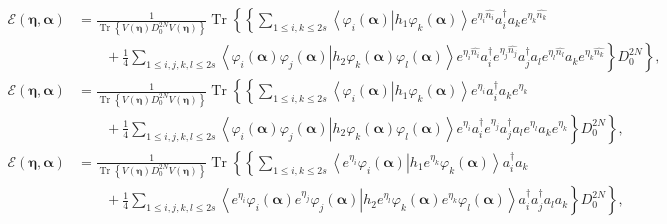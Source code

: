 \documentclass[aps,preprint]{revtex4}%
\begin{document}
\begin{align}
\mathcal{E}\left(  \mathbf{\eta,\alpha}\right)   &  =\frac{1}%
{\operatorname{Tr}\left\{  V\left(  \mathbf{\eta}\right)  D_{0}^{2N}V\left(
\mathbf{\eta}\right)  \right\}  }\operatorname{Tr}\left\{  \left\{
\sum_{1\leq i,k\leq2s}\left\langle \left.  \varphi_{i}\left(  \mathbf{\alpha
}\right)  \right\vert h_{1}\varphi_{k}\left(  \mathbf{\alpha}\right)
\right\rangle e^{\eta_{i}\widehat{n_{i}}}a_{i}^{\dagger}a_{k}e^{\eta
_{k}\widehat{n_{k}}}\right.  \right. \nonumber\\
&  \qquad+\left.  \left.  \frac{1}{4}\sum_{1\leq i,j,k,l\leq2s}\left\langle
\left.  \varphi_{i}\left(  \mathbf{\alpha}\right)  \varphi_{j}\left(
\mathbf{\alpha}\right)  \right\vert h_{2}\varphi_{k}\left(  \mathbf{\alpha
}\right)  \varphi_{l}\left(  \mathbf{\alpha}\right)  \right\rangle e^{\eta
_{i}\widehat{n_{i}}}a_{i}^{\dagger}e^{\eta_{j}\widehat{n_{j}}}a_{j}^{\dagger
}a_{l}e^{\eta_{l}\widehat{n_{l}}}a_{k}e^{\eta_{k}\widehat{n_{k}}}\right\}
D_{0}^{2N}\right\}  ,
\end{align}%
\begin{align}
\mathcal{E}\left(  \mathbf{\eta,\alpha}\right)   &  =\frac{1}%
{\operatorname{Tr}\left\{  V\left(  \mathbf{\eta}\right)  D_{0}^{2N}V\left(
\mathbf{\eta}\right)  \right\}  }\operatorname{Tr}\left\{  \left\{
\sum_{1\leq i,k\leq2s}\left\langle \left.  \varphi_{i}\left(  \mathbf{\alpha
}\right)  \right\vert h_{1}\varphi_{k}\left(  \mathbf{\alpha}\right)
\right\rangle e^{\eta_{i}}a_{i}^{\dagger}a_{k}e^{\eta_{k}}\right.  \right.
\nonumber\\
&  \qquad+\left.  \left.  \frac{1}{4}\sum_{1\leq i,j,k,l\leq2s}\left\langle
\left.  \varphi_{i}\left(  \mathbf{\alpha}\right)  \varphi_{j}\left(
\mathbf{\alpha}\right)  \right\vert h_{2}\varphi_{k}\left(  \mathbf{\alpha
}\right)  \varphi_{l}\left(  \mathbf{\alpha}\right)  \right\rangle e^{\eta
_{i}}a_{i}^{\dagger}e^{\eta_{j}}a_{j}^{\dagger}a_{l}e^{\eta_{l}}a_{k}%
e^{\eta_{k}}\right\}  D_{0}^{2N}\right\}  ,
\end{align}%
\begin{align}
\mathcal{E}\left(  \mathbf{\eta,\alpha}\right)   &  =\frac{1}%
{\operatorname{Tr}\left\{  V\left(  \mathbf{\eta}\right)  D_{0}^{2N}V\left(
\mathbf{\eta}\right)  \right\}  }\operatorname{Tr}\left\{  \left\{
\sum_{1\leq i,k\leq2s}\left\langle \left.  e^{\eta_{i}}\varphi_{i}\left(
\mathbf{\alpha}\right)  \right\vert h_{1}e^{\eta_{k}}\varphi_{k}\left(
\mathbf{\alpha}\right)  \right\rangle a_{i}^{\dagger}a_{k}\right.  \right.
\nonumber\\
&  \qquad+\left.  \left.  \frac{1}{4}\sum_{1\leq i,j,k,l\leq2s}\left\langle
\left.  e^{\eta_{i}}\varphi_{i}\left(  \mathbf{\alpha}\right)  e^{\eta_{j}%
}\varphi_{j}\left(  \mathbf{\alpha}\right)  \right\vert h_{2}e^{\eta_{l}%
}\varphi_{k}\left(  \mathbf{\alpha}\right)  e^{\eta_{k}}\varphi_{l}\left(
\mathbf{\alpha}\right)  \right\rangle a_{i}^{\dagger}a_{j}^{\dagger}a_{l}%
a_{k}\right\}  D_{0}^{2N}\right\}  ,
\end{align}%
\end{document}
